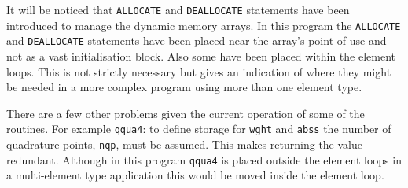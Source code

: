 \documentclass[a4paper,titlepage,11pt]{article}
\begin{document}
It will be noticed that {\tt ALLOCATE} and {\tt DEALLOCATE} statements have been
introduced to manage the dynamic memory arrays. In this program the {\tt ALLOCATE} 
and {\tt DEALLOCATE} statements have been placed near the array's point of use and not
as a vast initialisation block. Also some have been placed within the element loops. This
is not strictly necessary but gives an indication of where they might be needed in a
more complex program using more than one element type.

There are a few other problems given the current operation of some of the routines.
For example {\tt qqua4}: to define storage for {\tt wght} and {\tt abss} the number 
of quadrature  points, {\tt nqp}, must be assumed. This makes returning the value redundant.
Although in this program {\tt qqua4} is placed outside the element loops in a multi-element
type application this would be moved inside the element loop. 

\begin{quote}
\source

\end{quote}
\end{document}
